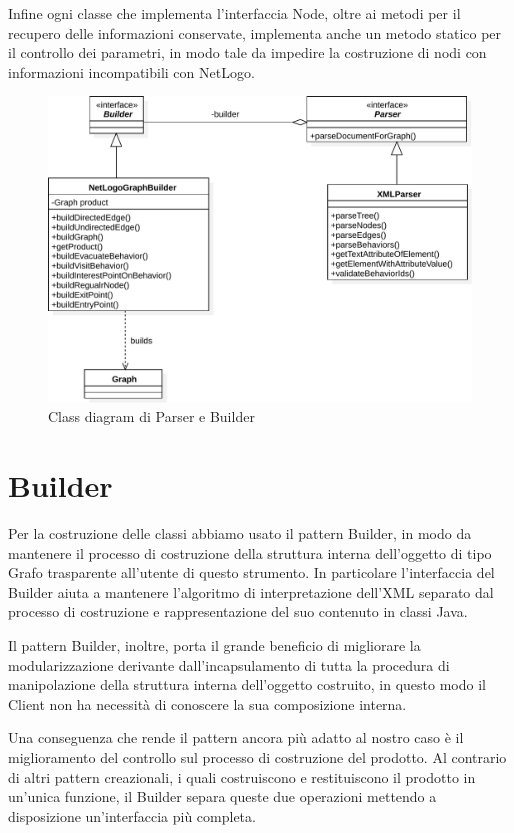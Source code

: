 Infine ogni classe che implementa l'interfaccia Node, oltre ai metodi per il recupero delle informazioni conservate, implementa anche un metodo statico per il controllo dei parametri, in modo tale da impedire la costruzione di nodi con informazioni incompatibili con NetLogo.

%
\begin{figure}[htbp]
\centering
\includegraphics[width=\textwidth,height=\textheight,keepaspectratio]{images/builder-diagram.pdf}
\caption{Class diagram di Parser e Builder}
\label{fig:builder-diagram}
\end{figure}
\section{Builder}
\label{sec:builder}
Per la costruzione delle classi abbiamo usato il pattern Builder, in modo da mantenere il processo di costruzione della struttura interna dell'oggetto di tipo Grafo trasparente all'utente di questo strumento. In particolare l'interfaccia del Builder aiuta a mantenere l'algoritmo di interpretazione dell'XML separato dal processo di costruzione e rappresentazione del suo contenuto in classi Java.

Il pattern Builder, inoltre, porta il grande beneficio di migliorare la modularizzazione derivante dall'incapsulamento di tutta la procedura di manipolazione della struttura interna dell'oggetto costruito, in questo modo il Client non ha necessità di conoscere la sua composizione interna.

Una conseguenza che rende il pattern ancora più adatto al nostro caso è il miglioramento del controllo sul processo di costruzione del prodotto. Al contrario di altri pattern creazionali, i quali costruiscono e restituiscono il prodotto in un'unica funzione, il Builder separa queste due operazioni mettendo a disposizione un'interfaccia più completa.


